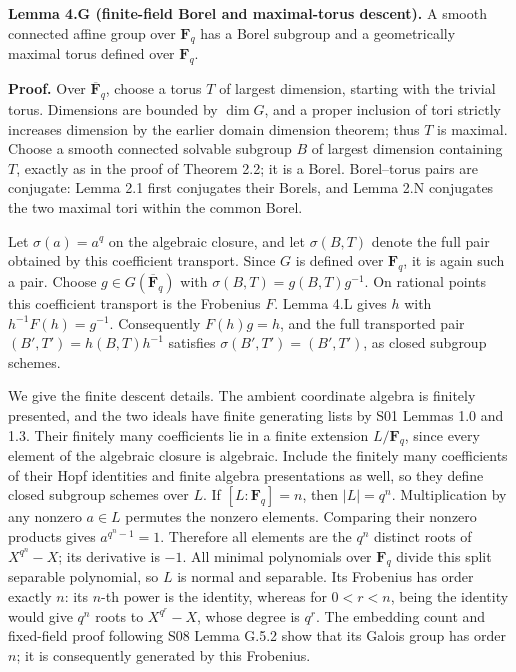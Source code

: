 \documentclass[11pt,a4paper,openany]{report}
\begin{document}
\textbf{Lemma 4.G (finite-field Borel and maximal-torus descent).} A smooth connected affine group over \(\mathbf F_q\) has a Borel subgroup and a geometrically maximal torus defined over \(\mathbf F_q\).

\textbf{Proof.} Over \(\overline{\mathbf F}_q\), choose a torus \(T\) of largest dimension, starting with the trivial torus. Dimensions are bounded by \(\dim G\), and a proper inclusion of tori strictly increases dimension by the earlier domain dimension theorem; thus \(T\) is maximal. Choose a smooth connected solvable subgroup \(B\) of largest dimension containing \(T\), exactly as in the proof of Theorem 2.2; it is a Borel. Borel--torus pairs are conjugate: Lemma 2.1 first conjugates their Borels, and Lemma 2.N conjugates the two maximal tori within the common Borel.

Let \(\sigma(a)=a^q\) on the algebraic closure, and let \(\sigma(B,T)\) denote the full pair obtained by this coefficient transport. Since \(G\) is defined over \(\mathbf F_q\), it is again such a pair. Choose \(g\in G(\overline{\mathbf F}_q)\) with \(\sigma(B,T)=g(B,T)g^{-1}\). On rational points this coefficient transport is the Frobenius \(F\). Lemma 4.L gives \(h\) with \(h^{-1}F(h)=g^{-1}\). Consequently \(F(h)g=h\), and the full transported pair \((B',T')=h(B,T)h^{-1}\) satisfies \(\sigma(B',T')=(B',T')\), as closed subgroup schemes.

We give the finite descent details. The ambient coordinate algebra is finitely presented, and the two ideals have finite generating lists by S01 Lemmas 1.0 and 1.3. Their finitely many coefficients lie in a finite extension \(L/\mathbf F_q\), since every element of the algebraic closure is algebraic. Include the finitely many coefficients of their Hopf identities and finite algebra presentations as well, so they define closed subgroup schemes over \(L\). If \([L:\mathbf F_q]=n\), then \(|L|=q^n\). Multiplication by any nonzero \(a\in L\) permutes the nonzero elements. Comparing their nonzero products gives \(a^{q^n-1}=1\). Therefore all elements are the \(q^n\) distinct roots of \(X^{q^n}-X\); its derivative is \(-1\). All minimal polynomials over \(\mathbf F_q\) divide this split separable polynomial, so \(L\) is normal and separable. Its Frobenius has order exactly \(n\): its \(n\)-th power is the identity, whereas for \(0<r<n\), being the identity would give \(q^n\) roots to \(X^{q^r}-X\), whose degree is \(q^r\). The embedding count and fixed-field proof following S08 Lemma G.5.2 show that its Galois group has order \(n\); it is consequently generated by this Frobenius.
\end{document}
